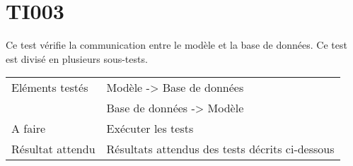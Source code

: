 
\section{TI003}
	Ce test vérifie la communication entre le modèle et la base de données. Ce test est divisé en plusieurs sous-tests.
	\begin{center}
     	\begin{tabular}[h]{|p{}|p{}|}
		\hline
			Eléments testés & Modèle -> Base de données  \\
						    &  Base de données -> Modèle \\\hline
    			A faire & Exécuter les tests \nameref{TI003.1} \nameref{TI003.2} \nameref{TI003.3} \\\hline
    			Résultat attendu & Résultats attendus des tests décrits ci-dessous \\\hline
     	\end{tabular}
  	\end{center}	
  	
  	




 	
